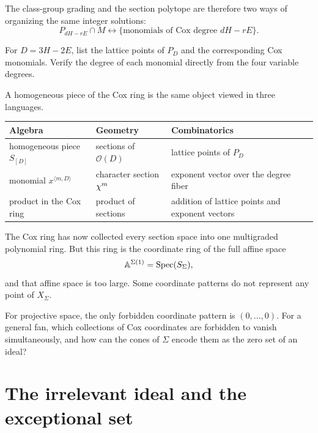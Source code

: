 The class-group grading and the section polytope are therefore two
ways of organizing the same integer solutions:
\[
\boxed{
P_{dH-rE}\cap M
\longleftrightarrow
\{\text{monomials of Cox degree }dH-rE\}.
}
\]

\begin{pauseandthink}
For \(D=3H-2E\), list the lattice points of \(P_D\) and the
corresponding Cox monomials. Verify the degree of each monomial
directly from the four variable degrees.
\end{pauseandthink}

\begin{threedictionaries}
A homogeneous piece of the Cox ring is the same object viewed in three
languages.

\medskip

\begin{center}
\small
\begin{tabularx}{\linewidth}{@{}
  >{\raggedright\arraybackslash}X
  >{\raggedright\arraybackslash}X
  >{\raggedright\arraybackslash}X@{}}
\toprule
\textbf{Algebra}
&
\textbf{Geometry}
&
\textbf{Combinatorics}
\\
\midrule
homogeneous piece \(S_{[D]}\)
&
sections of \(\mathcal O(D)\)
&
lattice points of \(P_D\)
\\
monomial \(x^{\langle m,D\rangle}\)
&
character section \(\chi^{m}\)
&
exponent vector over the degree fiber
\\
product in the Cox ring
&
product of sections
&
addition of lattice points and exponent vectors
\\
\bottomrule
\end{tabularx}
\end{center}
\end{threedictionaries}

The Cox ring has now collected every section space into one
multigraded polynomial ring. But this ring is the coordinate ring of
the full affine space
\[
\mathbb{A}^{\Sigma(1)}=\operatorname{Spec}(S_\Sigma),
\]
and that affine space is too large. Some coordinate patterns do not
represent any point of \(X_\Sigma\).

\begin{guidingquestion}
For projective space, the only forbidden coordinate pattern is
\((0,\dots,0)\). For a general fan, which collections of Cox
coordinates are forbidden to vanish simultaneously, and how can the
cones of \(\Sigma\) encode them as the zero set of an ideal?
\end{guidingquestion}
\section{The irrelevant ideal and the exceptional set}
\label{sec:irrelevant-ideal-exceptional-set}

